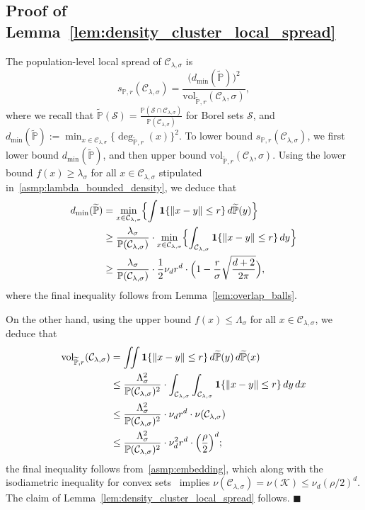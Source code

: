 \documentclass[twoside,11pt]{article}
\newcommand{\1}{\mathbf{1}}
\newcommand{\mc}[1]{\mathcal{#1}}
\newcommand{\Pbb}{\mathbb{P}}
\newcommand{\wt}[1]{\widetilde{#1}}
\newcommand{\vol}{\mathrm{vol}}
\newcommand{\qed}{\hfill $\blacksquare$}
\begin{document}
\subsection{Proof of Lemma~\ref{lem:density_cluster_local_spread}}
\label{subsec:density_cluster_local_spread}
The population-level local spread of $\mc{C}_{\lambda,\sigma}$ is
\begin{equation*}
s_{\Pbb,r}(\mc{C}_{\lambda,\sigma}) = \frac{\bigl(d_{\min}(\wt{\Pbb})\bigr)^2}{\vol_{\wt{\Pbb},r}(\mc{C}_{\lambda},\sigma)},
\end{equation*}
where we recall that $\wt{\Pbb}(\mc{S}) = \frac{\Pbb(\mc{S} \cap \mc{C}_{\lambda,\sigma})}{\Pbb(\mc{C}_{\lambda,\sigma})}$ for Borel sets $\mc{S}$, and $d_{\min}(\wt{\Pbb}) := \min_{x \in \mc{C}_{\lambda,\sigma}}\{\deg_{\wt{\Pbb},r}(x)\}^2$. To lower bound $s_{\Pbb,r}(\mc{C}_{\lambda,\sigma})$, we first lower bound $d_{\min}(\wt{\Pbb})$, and then upper bound $\vol_{\wt{\Pbb},r}(\mc{C}_{\lambda},\sigma)$. Using the lower bound $f(x) \geq \lambda_{\sigma}$ for all $x \in \mc{C}_{\lambda,\sigma}$ stipulated in~\ref{asmp:lambda_bounded_density}, we deduce that
\begin{align*}
d_{\min}(\wt{\Pbb}) & = \min_{x \in \mc{C}_{\lambda,\sigma}} \Bigl\{ \int \1\{\|x - y\| \leq r\} \,d\wt{\Pbb}(y) \Bigr\} \\
& \geq \frac{\lambda_{\sigma}}{\Pbb(\mc{C}_{\lambda,\sigma})} \cdot \min_{x \in \mc{C}_{\lambda,\sigma}} \Bigl\{ \int_{\mc{C}_{\lambda,\sigma}} \1\{\|x - y\| \leq r\} \,dy \Bigr\} \\
& \geq \frac{\lambda_{\sigma}}{\Pbb(\mc{C}_{\lambda,\sigma})} \cdot \frac{1}{2}\nu_dr^d \cdot \Bigl(1 - \frac{r}{\sigma} \sqrt{\frac{d + 2}{2\pi}}\Bigr),
\end{align*}
where the final inequality follows from Lemma~\ref{lem:overlap_balls}. 

On the other hand, using the upper bound $f(x) \leq \Lambda_{\sigma}$ for all $x \in \mc{C}_{\lambda,\sigma}$, we deduce that
\begin{align*}
\vol_{\wt{\Pbb},r}(\mc{C}_{\lambda,\sigma}) & = \iint \1\{\|x - y\|\leq r\} \,d\wt{\Pbb}(y) \,d\wt{\Pbb}(x) \\
& \leq \frac{\Lambda_{\sigma}^2}{\Pbb(\mc{C}_{\lambda,\sigma})^2} \cdot \int_{\mc{C}_{\lambda,\sigma}} \int_{\mc{C}_{\lambda,\sigma}} \1\{\|x - y\|\leq r\} \,dy \,dx \\
& \leq \frac{\Lambda_{\sigma}^2}{\Pbb(\mc{C}_{\lambda,\sigma})^2} \cdot \nu_d r^d \cdot \nu(\mc{C}_{\lambda,\sigma}) \\
& \leq \frac{\Lambda_{\sigma}^2}{\Pbb(\mc{C}_{\lambda,\sigma})^2} \cdot \nu_d^2 r^d  \cdot \Bigl(\frac{\rho}{2}\Bigr)^d;
\end{align*}
the final inequality follows from~\ref{asmp:embedding}, which along with the isodiametric inequality for convex sets~\citep{gruber2007} implies $\nu(\mc{C}_{\lambda,\sigma}) = \nu(\mc{K}) \leq \nu_d(\rho/2)^d$. The claim of Lemma~\ref{lem:density_cluster_local_spread} follows. \qed
\end{document}
